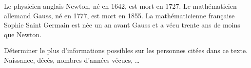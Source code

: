 \begin{exercice}
    Le physicien anglais Newton, né en 1642, est mort en 1727. Le mathématicien allemand Gauss, né en 1777, est mort en 1855. La mathématicienne française Sophie Saint Germain est née un an avant Gauss et a vécu trente ans de moins que Newton.
    
    Déterminer le plus d'informations possibles sur les personnes citées dans ce texte. Naissance, décès, nombres d'années vécues, \dots
 \end{exercice}
